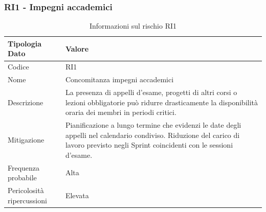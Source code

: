 \documentclass[a4paper,12pt]{article}
\begin{document}
\subsubsection{RI1 - Impegni accademici}
\begin{table}[H]
    \centering
    \renewcommand{\arraystretch}{1.4}
    \begin{tabularx}{\textwidth}{|L|Z|}
        \hline
        \textbf{Tipologia Dato} & \textbf{Valore} \\
        \hline
        Codice & RI1 \\
        \hline
        Nome & Concomitanza impegni accademici \\
        \hline
        Descrizione & La presenza di appelli d'esame, progetti di altri corsi o lezioni obbligatorie può ridurre drasticamente la disponibilità oraria dei membri in periodi critici. \\
        \hline
        Mitigazione & Pianificazione a lungo termine che evidenzi le date degli appelli nel calendario condiviso. Riduzione del carico di lavoro previsto negli Sprint coincidenti con le sessioni d'esame. \\
        \hline
        Frequenza probabile & Alta \\
        \hline
        Pericolosità ripercussioni & Elevata \\
        \hline
    \end{tabularx}
    \caption{Informazioni sul rischio RI1}
    \label{tab:RI1}
\end{table}
\end{document}
